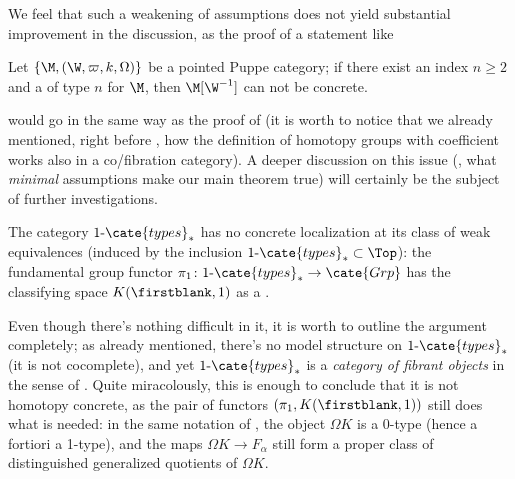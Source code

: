 We feel that such a weakening of assumptions does not yield substantial improvement in the discussion, as the proof of a statement like
\begin{theorem*}
Let $\{\M,(\W,\varpi,k,\Omega)\}$ be a pointed Puppe category; if there exist an index $n\ge 2$ and a \wco of type $n$ for $\M$, then $\M[\W^{-1}]$ can not be concrete.
\end{theorem*}
would go in the same way as the proof of \athm{} (it is worth to notice that we already mentioned, right before \adef{}, how the definition of homotopy groups with coefficient works also in a co/fibration category). A deeper discussion on this issue (\ie, what \emph{minimal} assumptions make our main theorem true) will certainly be the subject of further investigations.
\begin{example}\label{uno-tipi}
The category $1\text{-}\cate{types}_*$ has no concrete localization at its class of weak equivalences (induced by the inclusion $1\text{-}\cate{types}_*\subset\Top$): the fundamental group functor $\pi_1\colon 1\text{-}\cate{types}_* \to \cate{Grp}$ has the classifying space $K(\firstblank,1)$ as a \wco.
\end{example}
Even though there's nothing difficult in it, it is worth to outline the argument completely; as already mentioned, there's no model structure on $1\text{-}\cate{types}_*$ (it is not cocomplete), and yet $1\text{-}\cate{types}_*$ is a \emph{category of fibrant objects} in the sense of \cite{Kennet-1973}. Quite miracolously, this is enough to conclude that it is not homotopy concrete, as the pair of functors $(\pi_1,K(\firstblank,1))$ still does what is needed: in the same notation of \athm{}, the object $\Omega K$ is a 0-type (hence a fortiori a 1-type), and the maps $\Omega K \to F_\alpha$ still form a proper class of distinguished generalized quotients of $\Omega K$.

